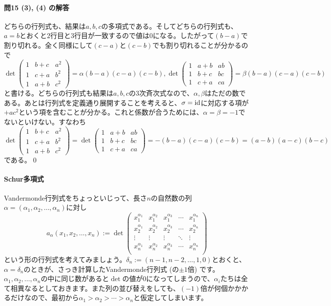 \paragraph{問15 (3), (4) の解答} どちらの行列式も、結果は$a, b, c$の多項式である。そしてどちらの行列式も、$a = b$とおくと$2$行目と$3$行目が一致するので値は$0$になる。したがって$(b - a)$で割り切れる。全く同様にして$(c - a)$と$(c - b)$でも割り切れることが分かるので
\[
\det
\begin{pmatrix}
1 & b + c & a^2 \\
1 & c + a & b^2 \\
1 & a + b & c^2
\end{pmatrix}
= \alpha (b - a)(c - a)(c - b), 
\det
\begin{pmatrix}
1 & a + b & ab \\
1 & b + c & bc \\
1 & c + a & ca
\end{pmatrix}
= \beta (b - a)(c - a)(c - b)
\]
と書ける。どちらの行列式も結果は$a, b, c$の$3$次斉次式なので、$\alpha, \beta$はただの数である。あとは行列式を定義通り展開することを考えると、$\sigma = \operatorname{id}$に対応する項が$+a c^2$という項を含むことが分かる。これと係数が合うためには、$\alpha = \beta = -1$でないといけない。すなわち
\[
\det
\begin{pmatrix}
1 & b + c & a^2 \\
1 & c + a & b^2 \\
1 & a + b & c^2
\end{pmatrix}
= 
\det
\begin{pmatrix}
1 & a + b & ab \\
1 & b + c & bc \\
1 & c + a & ca
\end{pmatrix}
= - (b - a)(c - a)(c - b)
= (a - b)(a - c)(b - c)
\]
である。\qed

\paragraph{Schur多項式} Vandermonde行列式をちょっといじって、長さ$n$の自然数の列$\alpha = (\alpha_1, \alpha_2, \ldots, \alpha_n)$に対し
\[
a_{\alpha}(x_1, x_2, \ldots, x_n) :=
\det
\begin{pmatrix}
x_1^{\alpha_1} & x_1^{\alpha_2} & x_1^{\alpha_3} & \cdots & x_1^{\alpha_n} \\
x_2^{\alpha_1} & x_2^{\alpha_2} & x_2^{\alpha_3} & \cdots & x_2^{\alpha_n} \\
\vdots & \vdots & \vdots & \ddots & \vdots \\
x_n^{\alpha_1} & x_n^{\alpha_2} & x_n^{\alpha_3} & \cdots & x_n^{\alpha_n} \\
\end{pmatrix}
\]
という形の行列式を考えてみましょう。$\delta_n := (n - 1, n - 2, \ldots, 1, 0)$とおくと、$\alpha = \delta_n$のときが、さっき計算したVandermonde行列式 (の$\pm1$倍) です。$\alpha_1, \alpha_2, \ldots, \alpha_n$の中に同じ数があると$\det$の値が$0$になってしまうので、$\alpha_i$たちは全て相異なるとしておきます。また列の並び替えをしても、$(-1)$倍が何個かかかるだけなので、最初から$\alpha_1 > \alpha_2 > \cdots > \alpha_n$と仮定してしまいます。

